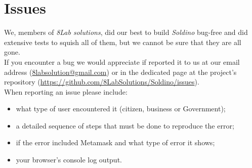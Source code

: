 \section{Issues}
We, members of \textit{8Lab solutions}, did our best to build \textit{Soldino} 
bug-free and did extensive tests to squish all of them, but we cannot be sure 
that they are all gone.\\
If you encounter a bug we would appreciate if reported it to us at our 
email address (\href{mailto:8labsolution@gmail.com}{8labsolution@gmail.com}) 
or in the dedicated page at the project's repository (\url{https://github.com/8LabSolutions/Soldino/issues}).
\\When reporting an issue please include:
\begin{itemize}
	\item what type of user encountered it (citizen, business or Government);
	\item a detailed sequence of steps that must be done to reproduce the error;
	\item if the error included Metamask and what type of error it shows;
	\item your browser's console log output.
\end{itemize}

